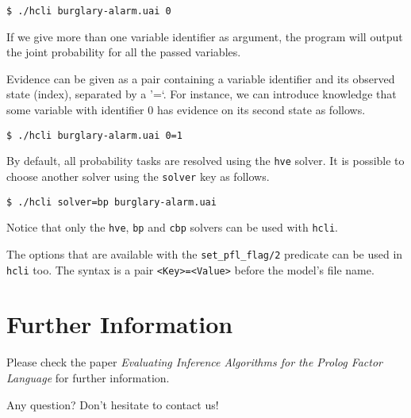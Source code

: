 \documentclass{article}
\begin{document}
\texttt{\$ ./hcli burglary-alarm.uai 0}

If we give more than one variable identifier as argument, the program will output the joint probability for all the passed variables.

Evidence can be given as a pair containing a variable identifier and its observed state (index), separated by a '=`. For instance, we can introduce knowledge that some variable with identifier $0$ has evidence on its second state as follows.

\texttt{\$ ./hcli burglary-alarm.uai 0=1}

By default, all probability tasks are resolved using the \texttt{hve} solver. It is possible to choose another solver using the \texttt{solver} key as follows.

\texttt{\$ ./hcli solver=bp burglary-alarm.uai}

Notice that only the \texttt{hve}, \texttt{bp} and \texttt{cbp} solvers can be used with \texttt{hcli}.

The options that are available with the \texttt{set\_pfl\_flag/2} predicate can be used in \texttt{hcli} too. The syntax is a pair \texttt{<Key>=<Value>} before the model's file name.



\section{Further Information}
Please check the paper \textit{Evaluating Inference Algorithms for the Prolog Factor Language} for further information.

Any question? Don't hesitate to contact us!
\end{document}
